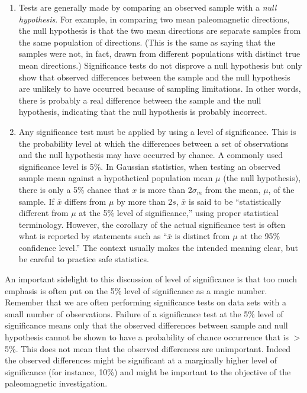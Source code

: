 \begin{enumerate}
\item
 Tests are generally made by comparing an observed sample with a {\it null hypothesis}. For example, in
comparing two mean paleomagnetic directions, the null hypothesis is that the two mean directions
are separate samples from the same population of directions. (This is the same as saying that the
samples were not, in fact, drawn from different populations with distinct true mean directions.) Significance
tests do not disprove a null hypothesis but only show that observed differences between the
sample and the null hypothesis are unlikely to have occurred because of sampling limitations. In other
words, there is probably a real difference between the sample and the null hypothesis, indicating
that the null hypothesis is probably incorrect.
\item  Any significance test must be applied by using a level of significance. This is the probability level at
which the differences between a set of observations and the null hypothesis may have occurred by
chance. A commonly used significance level is 5\%. In Gaussian statistics, when testing an observed
sample mean against a hypothetical population mean $\mu$ (the null hypothesis), there is only a
5\% chance that $x$  is more than 2$\sigma_m$ from the mean, $\mu$, of the sample. If $\bar x$ differs from $\mu$ by more
than 2$s$, $\bar x$ is said to be ``statistically different from $\mu$ at the 5\% level of significance,''  using proper
statistical terminology. However, the corollary of the actual significance test is often what is reported
by statements such as ``$\bar x$  is distinct from $\mu$ at the 95\% confidence level.''  The context usually makes
the intended meaning clear, but be careful to practice safe statistics.
\end{enumerate}

An important sidelight to this discussion of level of significance is that too much emphasis is often put on
the 5\% level of significance as a magic number. Remember that we are often performing significance tests
on data sets with a small number of observations. Failure of a significance test at the 5\% level of significance
means only that the observed differences between sample and null hypothesis cannot be shown to
have a probability of chance occurrence that is $>$ 5\%. This does not mean that the observed differences are
unimportant. Indeed the observed differences might be significant at a marginally higher level of significance
(for instance, 10\%) and might be important to the objective of the paleomagnetic investigation.


